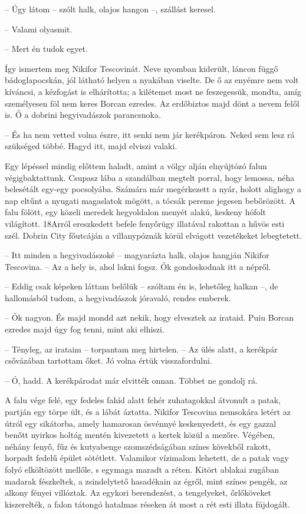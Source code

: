 \documentclass{IEEEtran}
\begin{document}
– Úgy látom – szólt halk, olajos hangon –, szállást keresel.

– Valami olyasmit.

– Mert én tudok egyet.

Így ismertem meg Nikifor Tescovinát. Neve nyomban kiderült, láncon függő
bádoglapocskán, jól látható helyen a nyakában viselte. De ő az enyémre nem
volt kíváncsi, a kézfogást is elhárította; a kilétemet most ne feszegessük,
mondta, amíg személyesen föl nem keres Borcan ezredes. Az erdőbiztos majd dönt
a nevem felől is. Ő a dobrini hegyivadászok parancsnoka.

– És ha nem vetted volna észre, itt senki nem jár kerékpáron. Neked sem lesz
rá szükséged többé. Hagyd itt, majd elviszi valaki.

Egy lépéssel mindig előttem haladt, amint a völgy alján elnyújtózó falun
végigbaktattunk. Csupasz lába a szandálban megtelt porral, hogy lemossa, néha
belesétált egy-egy pocsolyába. Számára már megérkezett a nyár, holott alighogy
a nap eltűnt a nyugati magaslatok mögött, a tócsák pereme jegesen bebőrözött.
A falu fölött, egy közeli meredek hegyoldalon menyét alakú, keskeny hófolt
világított. 18Arról ereszkedett befele fenyőrügy illatával rakottan a hűvös
esti szél. Dobrin City főutcáján a villanypóznák körül elvágott vezetékeket
lebegtetett.

– Itt minden a hegyivadászoké – magyarázta halk, olajos hangján Nikifor
Tescovina. – Az a hely is, ahol lakni fogsz. Ők gondoskodnak itt a népről.

– Eddig csak képeken láttam belőlük – szóltam én is, lehetőleg halkan –, de
hallomásból tudom, a hegyivadászok jóravaló, rendes emberek.

– Ők nagyon. És majd mondd azt nekik, hogy elvesztek az irataid. Puiu Borcan
ezredes majd úgy fog tenni, mint aki elhiszi.

– Tényleg, az irataim – torpantam meg hirtelen. – Az ülés alatt, a kerékpár
csővázában tartottam őket. Jó volna értük visszafordulni.

– Ó, hadd. A kerékpárodat már elvitték onnan. Többet ne gondolj rá.

A falu vége felé, egy fedeles fahíd alatt fehér zuhatagokkal átvonult a patak,
partján egy törpe ült, és a lábát áztatta. Nikifor Tescovina nemsokára letért
az útról egy sikátorba, amely hamarosan ösvénnyé keskenyedett, és egy gazzal
benőtt nyirkos holtág mentén kivezetett a kertek közül a mezőre. Végében,
néhány fenyő, fűz és kutyabenge szomszédságában színes kövekből rakott,
horpadt fedelű épület sötétlett. Valamikor vízimalom lehetett, de a patak vagy
folyó elköltözött mellőle, s egymaga maradt a réten. Kitört ablakai zugában
madarak fészkeltek, a zsindelytető hasadékain az égről, mint színes pengék, az
alkony fényei villóztak. Az egykori berendezést, a tengelyeket, őrlőköveket
kiszerelték, a falon tátongó hatalmas réseken át most a rét esti illata
fújdogált.
\end{document}
